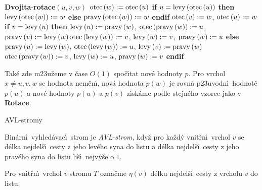{\bf Dvojita}-{\bf rotace$\left(u,v,w\right)$\newline 
$\operatorname{otec}\left(w\right):=\operatorname{otec}\left(u\right)$\newline 
if} $u=\operatorname{levy}\left(\operatorname{otec}\left(u\right)\right)$ {\bf then}\newline 
\phantom{---}$\operatorname{levy}\left(\operatorname{otec}\left(w\right)\right):=w$\newline 
{\bf else}\newline 
\phantom{---}$\operatorname{pravy}\left(\operatorname{otec}\left(w\right)\right):=w$\newline 
{\bf endif}\newline 
$\operatorname{otec}\left(v\right):=w$, $\operatorname{otec}\left(u\right):=w$\newline 
{\bf if} $v=\operatorname{levy}\left(u\right)$ {\bf then}\newline  
\phantom{---}$\operatorname{levy}\left(u\right):=\operatorname{pravy}\left(w\right)$, $\operatorname{otec}\left(\operatorname{pravy}\left(w\right)\right):=u$, $\operatorname{pravy}\left(v\right):=\operatorname{levy}\left(w\right)$\newline \phantom{---}$\operatorname{otec}\left(\operatorname{levy}\left(w\right)\right):=v$, $\operatorname{levy}\left(w\right):=v$, $\operatorname{pravy}\left(w\right):=u$\newline 
{\bf else}\newline 
\phantom{---}$\operatorname{pravy}\left(u\right):=\operatorname{levy}\left(w\right)$, $\operatorname{otec}\left(\operatorname{levy}\left(w\right)\right):=u$, $\operatorname{levy}\left(v\right):=\operatorname{pravy}\left(w\right)$\newline 
\phantom{---}$\operatorname{otec}\left(\operatorname{pravy}\left(w\right)\right):=v$, $\operatorname{levy}\left(w\right):=u$, $\operatorname{pravy}\left(w\right):=v$\newline 
{\bf endif}
\medskip

\flushpar Tak\'e zde m\accent23u\v zeme v \v case $O\left(1\right)$ spo\v c\'\i tat nov\'e hodnoty $
p$. 
Pro vrchol $x\ne u,v,w$ se hodnota nem\v en\'\i , nov\'a hodnota 
$p\left(w\right)$ je 
rovn\'a p\accent23uvodn\'\i\ hodnot\v e $p\left(u\right)$ a nov\'e hodnoty $
p\left(u\right)$ 
a $p\left(v\right)$ 
z\'\i sk\'ame pod\-le stejn\'eho vzorce  jako v {\bf Rotace}.

\heading
AVL-stromy
\endheading

\flushpar Bin\'arn\'\i\ vyhled\'avac\'\i\ strom je 
\emph{AVL}-\emph{strom}, kdy\v z pro ka\v zd\'y vnit\v r\-n\'\i\ vrchol 
$v$ se d\'elka nejdel\v s\'\i\ cesty z jeho lev\'eho syna do 
listu a d\'elka nejdel\v s\'\i\ cesty z jeho prav\'eho syna do listu 
li\v s\'\i\ nejv\'y\v se o $1$.  
\medskip

\flushpar Pro vnit\v rn\'\i\ vrchol $v$ stromu $T$ ozna\v cme $\eta 
\left(v\right)$ 
d\'elku nejdel\v s\'\i\ cesty z vrcholu $v$ do listu.
\medskip
 
